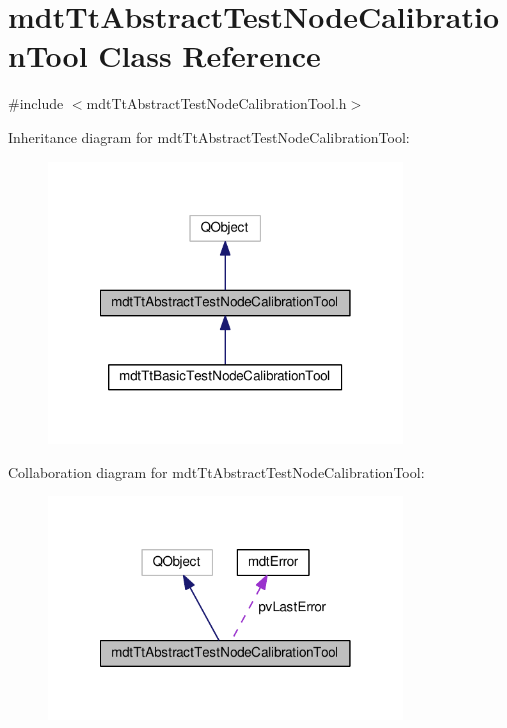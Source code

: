 \hypertarget{classmdt_tt_abstract_test_node_calibration_tool}{\section{mdt\-Tt\-Abstract\-Test\-Node\-Calibration\-Tool Class Reference}
\label{classmdt_tt_abstract_test_node_calibration_tool}
}


{\ttfamily \#include $<$mdt\-Tt\-Abstract\-Test\-Node\-Calibration\-Tool.\-h$>$}



Inheritance diagram for mdt\-Tt\-Abstract\-Test\-Node\-Calibration\-Tool\-:\nopagebreak
\begin{figure}[H]
\begin{center}
\leavevmode
\includegraphics[width=266pt]{classmdt_tt_abstract_test_node_calibration_tool__inherit__graph}
\end{center}
\end{figure}


Collaboration diagram for mdt\-Tt\-Abstract\-Test\-Node\-Calibration\-Tool\-:\nopagebreak
\begin{figure}[H]
\begin{center}
\leavevmode
\includegraphics[width=266pt]{classmdt_tt_abstract_test_node_calibration_tool__coll__graph}
\end{center}
\end{figure}

